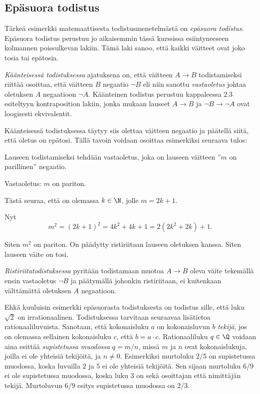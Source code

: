 \subsection*{Epäsuora todistus}
Tärkeä esimerkki matemaattisesta todistusmenetelmästä on {\em epäsuora todistus}. Epäsuora todistus perustuu jo aikaisemmin tässä kurssissa esiintyneeseen kolmannen poissulkevan lakiin. Tämä laki sanoo, että kaikki väitteet ovat joko tosia tai epätosia.

{\em Käänteisessä todistuksessa} ajatuksena on, että väitteen $A\to B$ todistamiseksi riittää osoittaa, että väitteen $B$ negaatio $\lnot B$ eli niin sanottu {\em vastaoletus} johtaa oletuksen $A$ negaatioon $\lnot A$. Käänteinen todistus perustuu kappaleessa 2.3 esiteltyyn kontraposition lakiin, jonka mukaan lauseet $A\to B$ ja $\lnot B \to \lnot A$ ovat loogisesti ekvivalentit. 

Käänteisessä todistuksessa täytyy siis olettaa väitteen negaatio ja päätellä siitä, että oletus on epätosi. Tällä tavoin voidaan osoittaa esimerkiksi seuraava tulos:


\begin{todistus}
Lauseen todistamiseksi tehdään vastaoletus, joka on lauseen väitteen ''$m$ on parillinen'' negaatio.

Vastaoletus: $m$ on pariton.

Tästä seuraa, että on olemassa $k\in \N$, jolle $m=2k+1$.

Nyt
\[
m^2 = (2k+1)^2 = 4k^2+4k+1 = 2(2k^2+2k)+1.
\]

Siten $m^2$ on pariton. On päädytty ristiriitaan lauseen oletuksen kanssa. Siten lauseen väite on tosi.
\end{todistus}

{\em Ristiriitatodistuksessa} pyritään todistamaan muotoa $A\to B$ oleva väite tekemällä ensin vastaoletus $\lnot B$ ja päätymällä johonkin ristiriitaan, ei kuitenkaan välttämättä oletuksen $A$ negaatioon.

Ehkä kuuluisin esimerkki epäsuorasta todistuksesta on todistus sille, että luku $\sqrt{2}$ on irrationaalinen. Todistuksessa tarvitaan seuraavaa lisätietoa rationaaliluvuista. Sanotaan, että kokonaisluku $a$ on kokonaisluvun $b$ {\em tekijä}, jos on olemassa sellainen kokonaisluku $c$, että $b=a\cdot c$. Rationaaliluku $q\in\Q$ voidaan aina esittää {\em supistetussa muodossa} $q=m/n$, missä $m$ ja $n$ ovat kokonaislukuja, joilla ei ole yhteisiä tekijöitä, ja $n\neq 0$. Esimerkiksi murtoluku $2/5$ on supistetussa muodossa, koska luvuilla $2$ ja $5$ ei ole yhteisiä tekijöitä. Sen sijaan murtoluku $6/9$ ei ole supistetussa muodossa, koska luku $3$ on sekä osoittajan että nimittäjän tekijä. Murtoluvun $6/9$ esitys supistetussa muodossa on $2/3$.

